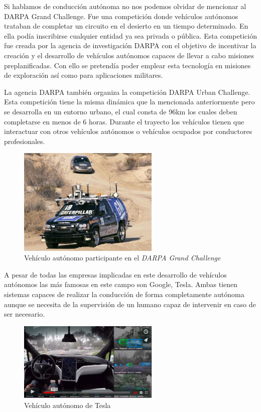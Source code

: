 Si hablamos de conducción autónoma no nos podemos olvidar de mencionar al DARPA Grand Challenge. Fue una competición donde vehículos autónomos trataban de completar un circuito en el desierto en un tiempo determinado. En ella podía inscribirse cualquier entidad ya sea privada o pública. Esta competición fue creada por la agencia de investigación DARPA con el objetivo de incentivar la creación y el desarrollo de vehículos autónomos capaces de  llevar a cabo misiones preplanificadas. Con ello se pretendía poder emplear esta tecnología en misiones de exploración así como para aplicaciones militares.


La agencia DARPA también organiza la competición DARPA Urban Challenge. Esta competición tiene la misma dinámica que la mencionada anteriormente pero se desarrolla en un entorno urbano, el cual consta de 96km los cuales deben completarse en menos de 6 horas. Durante el trayecto los vehículos tienen que interactuar con otros vehículos autónomos o vehículos ocupados por conductores profesionales. 

\begin{figure}[H]
  \begin{center}
    \includegraphics[width=0.6\textwidth]{figures/Introduccion/darpa.jpg}
		\caption{ Vehículo autónomo participante en el \textit{DARPA Grand Challenge}}
		\label{fig.darpa}
		\end{center}
\end{figure}


A pesar de todas las empresas implicadas en este desarrollo de vehículos autónomos las más famosas en este campo son Google, Tesla. Ambas tienen sistemas capaces de realizar la conducción de forma completamente autónoma aunque se necesita de la supervisión de un humano capaz de intervenir en caso de ser necesario.

\begin{figure}[H]
  \begin{center}
    \includegraphics[width=0.6\textwidth]{figures/Introduccion/tesla.png}
		\caption{ Vehículo autónomo de Tesla}
		\label{fig.tesla}
		\end{center}
\end{figure}

